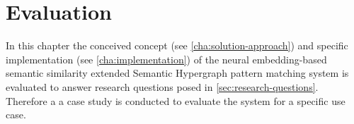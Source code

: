 \documentclass[11pt, numbers=noenddot]{scrreprt}
\begin{document}
%
%






\chapter{Evaluation}
\label{cha:evaluation}
In this chapter the conceived concept (see \cref{cha:solution-approach}) and specific implementation (see \cref{cha:implementation}) of the neural embedding-based semantic similarity extended Semantic Hypergraph pattern matching system is evaluated to answer research questions posed in \cref{sec:research-questions}.  Therefore a a case study is conducted to evaluate the system for a specific use case. 

\end{document}
